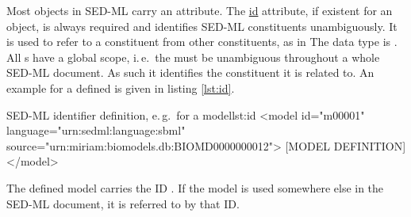 \label{sec:id}
%

Most objects in SED-ML carry an  attribute. 
The \hyperref[sec:id]{id} attribute, if existent for an object, is always required and identifies SED-ML constituents unambiguously.  
It is used to refer to a constituent from other constituents, as in 
The  data type is . All s have a global scope, i.\,e.\ the  must be unambiguous throughout a whole SED-ML document. As such it identifies the constituent it is related to.
An example for a defined  is given in listing \ref{lst:id}.
%
\begin{myXmlLst}{SED-ML identifier definition, e.\,g.\ for a model}{lst:id}
<model id="m00001" language="urn:sedml:language:sbml" source="urn:miriam:biomodels.db:BIOMD0000000012">
 [MODEL DEFINITION]
</model>
\end{myXmlLst}
%
The defined model carries the ID . If the model is used somewhere else in the SED-ML document, it is referred to by that ID.


